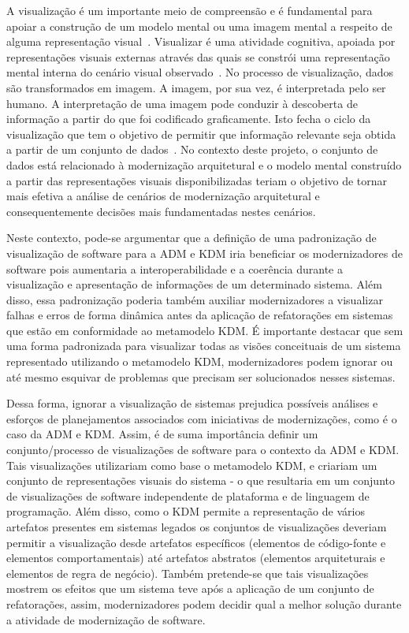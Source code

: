 \documentclass[12pt]{article}
\begin{document}
A visualização é um importante meio de compreensão e é fundamental para apoiar a construção de um modelo mental ou uma imagem mental a respeito de alguma representação visual~\cite{spence2014information}. Visualizar é uma atividade cognitiva, apoiada por representações visuais externas através das quais se constrói uma representação mental interna do cenário visual observado~\cite{spence2014information, ware2012information}. No processo de visualização, dados são transformados em imagem. A imagem, por sua vez, é interpretada pelo ser humano. A interpretação de uma imagem pode conduzir à descoberta de informação a partir do que foi codificado graficamente. Isto fecha o ciclo da visualização que tem o objetivo de permitir que informação relevante seja obtida a partir de um conjunto de dados~\cite{source_miner_glauco}. No contexto deste projeto, o conjunto de dados está relacionado à modernização arquitetural e o modelo mental construído a partir das representações visuais disponibilizadas teriam o objetivo de tornar mais efetiva a análise de cenários de modernização arquitetural e consequentemente decisões mais fundamentadas nestes cenários. 

Neste contexto, pode-se argumentar que a definição de uma padronização de visualização de software para a ADM e KDM iria beneficiar os modernizadores de software pois aumentaria a interoperabilidade e a coerência durante a visualização e apresentação de informações de um determinado sistema. Além disso, essa padronização poderia também auxiliar modernizadores a visualizar falhas e erros  de forma dinâmica antes da aplicação de refatorações em sistemas que estão em conformidade ao metamodelo KDM. É importante destacar que sem uma forma padronizada para visualizar todas as visões conceituais de um sistema representado utilizando o metamodelo KDM, modernizadores podem ignorar ou até mesmo esquivar de problemas que precisam ser solucionados nesses sistemas. 

Dessa forma, ignorar a visualização de sistemas prejudica possíveis análises e esforços de planejamentos associados com iniciativas de modernizações, como é o caso da ADM e KDM. Assim, é de suma importância definir um conjunto/processo de visualizações de software para o contexto da ADM e KDM. Tais visualizações utilizariam como base o metamodelo KDM, e criariam um conjunto de representações visuais do sistema - o que resultaria em um conjunto de visualizações de software independente de plataforma e de linguagem de programação. Além disso, como o KDM permite a representação de vários artefatos presentes em sistemas legados os conjuntos de visualizações deveriam permitir a visualização desde artefatos específicos (elementos de código-fonte e elementos comportamentais) até artefatos abstratos (elementos arquiteturais e elementos de regra de negócio). Também pretende-se que tais visualizações mostrem os efeitos que um sistema teve após a aplicação de um conjunto de refatorações, assim, modernizadores podem decidir qual a melhor solução durante a atividade de modernização de software.
\end{document}
